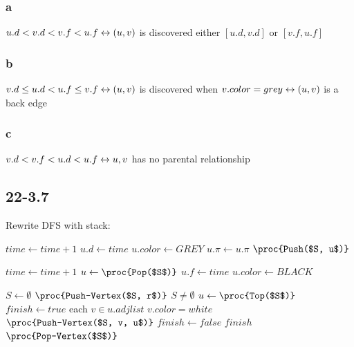 \documentclass[]{article}
\begin{document}
\subsubsection{a}
$u.d < v.d < v.f < u.f \leftrightarrow \\
(u,v)$ is discovered either $[u.d, v.d]$ or $[v.f, u.f]$
\subsubsection{b}
$v.d \le u.d < u.f \le v.f \leftrightarrow \\
(u,v)$ is discovered when $v.color = grey \leftrightarrow\\
(u,v)$ is a back edge
\subsubsection{c}
$v.d < v.f < u.d < u.f \leftrightarrow \\
u, v$ has no parental relationship
\subsection{22-3.7}

Rewrite DFS with stack:

\begin{codebox}
	
	\li $time \leftarrow time + 1$
	\li $u.d \leftarrow time$
	\li $u.color \leftarrow GREY$
	\li $u.\pi \leftarrow u.\pi$
	\li $\proc{Push($S, u$)}$
	
\end{codebox}

\begin{codebox}
	
	\li $time \leftarrow time + 1$
	\li $u \leftarrow \proc{Pop($S$)}$
	\li $u.f \leftarrow time$
	\li $u.color \leftarrow BLACK$
	
\end{codebox}

\begin{codebox}
	
	\li $S \leftarrow \emptyset$
	\li $\proc{Push-Vertex($S, r$)}$
	\li \While $S \neq \emptyset$
	\li \Do $u \leftarrow \proc{Top($S$)}$
	\li $finish \leftarrow true$
	\li \For each $v \in u.adjlist$
	\li \Do \If $v.color = white$
	\li \Then $\proc{Push-Vertex($S, v, u$)}$
	\li	$finish \leftarrow false$ \End \End
	\li \If $finish$
	\li \Then $\proc{Pop-Vertex($S$)}$
	
\end{codebox}
\end{document}
